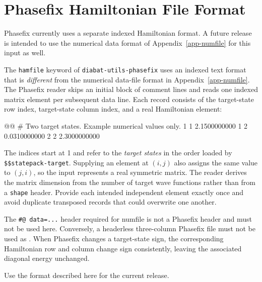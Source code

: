 \chapter{Phasefix Hamiltonian File Format}\label{app-hamfile}
Phasefix currently uses a separate indexed Hamiltonian format. A future release is intended to use the numerical data format of Appendix~\ref{app-numfile} for this input as well.

The \texttt{hamfile} keyword of \texttt{diabat-utils-phasefix} uses an indexed text format that is \emph{different} from the numerical data-file format in Appendix~\ref{app-numfile}. The Phasefix reader skips an initial block of comment lines and reads one indexed matrix element per subsequent data line. Each record consists of the target-state row index, target-state column index, and a real Hamiltonian element:
\begin{lst-script}
@@
# Two target states. Example numerical values only.
1 1 2.1500000000
1 2 0.0310000000
2 2 2.3000000000
\end{lst-script}
The indices start at 1 and refer to the \emph{target states} in the order loaded by \texttt{\$\$statepack-target}. Supplying an element at \((i,j)\) also assigns the same value to \((j,i)\), so the input represents a real symmetric matrix. The reader derives the matrix dimension from the number of target wave functions rather than from a \texttt{shape} header. Provide each intended independent element exactly once and avoid duplicate transposed records that could overwrite one another.

The \texttt{\#@ data=...} header required for numfile is not a Phasefix header and must not be used here. Conversely, a headerless three-column Phasefix file must not be used as . When Phasefix changes a target-state sign, the corresponding Hamiltonian row and column change sign consistently, leaving the associated diagonal energy unchanged.

Use the format described here for the current release.
